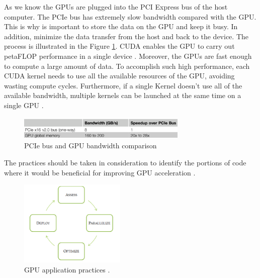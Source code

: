 As we know the GPUs are plugged into the PCI Express bus of the host computer. The PCIe bus has extremely slow bandwidth compared with the GPU. This is why is important to store the data on the GPU and keep it busy. In addition, minimize the data transfer from the host and back to the device. The process is illustrated in the Figure \ref{fig:PCI}. CUDA enables the GPU to carry out petaFLOP performance in a single device \cite{cook}. Moreover, the GPUs are fast enough to compute a large amount of data. To accomplish such high performance, each CUDA kernel needs to use all the available resources of the GPU, avoiding wasting compute cycles. Furthermore, if a single Kernel doesn't use all of the available bandwidth, multiple kernels can be launched at the same time on a single GPU \cite{design}.

\begin{figure}[htbp]
	\centering
		\includegraphics[width=0.72\textwidth]{Figures/PCI.png}
		\smallskip
	\caption[PCIe Bandwidth]{PCIe bus and GPU bandwidth comparison \cite{cook}}
	\label{fig:PCI}
\end{figure}

The practices should be taken in consideration to identify the portions of code where it would be beneficial for improving GPU acceleration \cite{practices}.

\begin{figure}[htbp]
	\centering
		\includegraphics[width=0.45\textwidth]{Figures/apod.png}
		\smallskip
	\caption[GPU application practices]{GPU application practices \cite{practices}.}
	\label{fig:apod}
\end{figure}

